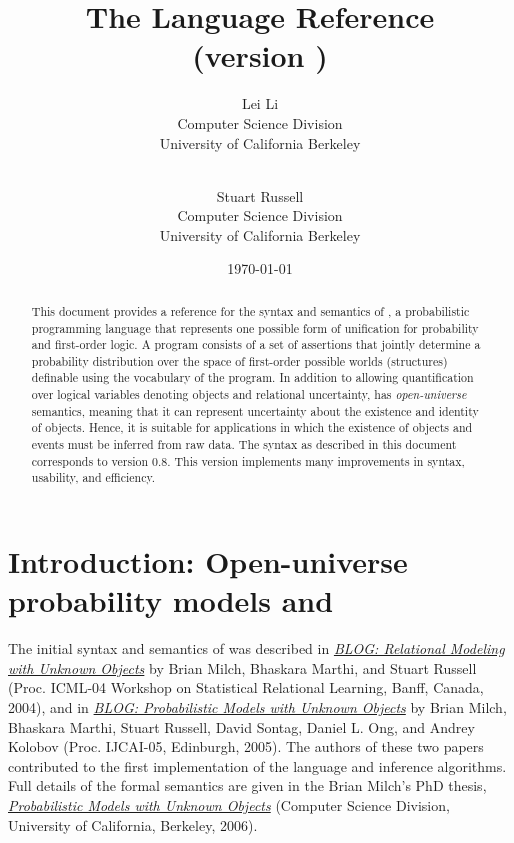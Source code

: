 \documentclass[12pt]{article}
\title{The \bl Language Reference  \\
{\large (\bl version \blogversion)}
}
\author{Lei Li\\
              Computer Science Division\\
              University of California Berkeley\\
               \email{leili@cs.berkeley.edu}\\
\and
               Stuart Russell\\
              Computer Science Division\\
              University of California Berkeley\\
               \email{russell@cs.berkeley.edu}
               }
\date{\today}
\newcommand{\blogversion}{0.8\xspace}
\begin{document}
\maketitle


\begin{abstract}
This document provides a reference for the syntax and semantics of \bl, a probabilistic programming language
that represents one possible form of unification for probability and first-order logic.
A \bl program consists of a set of assertions that jointly determine a probability distribution
over the space of first-order possible worlds (structures) definable using the vocabulary of
the program. In addition to allowing quantification over logical variables denoting objects and relational uncertainty,
\bl has {\em open-universe} semantics, meaning that it can represent uncertainty about the existence and
identity of objects. Hence, it is suitable for applications in which the existence of objects and events must be inferred from raw data.
The syntax as described in this document corresponds to \bl version \blogversion. This version implements many
improvements in syntax, usability, and efficiency.
\end{abstract}

\clearpage

\tableofcontents

\clearpage

\section{Introduction: Open-universe probability models and \bl}\label{intro-section}

The initial syntax and semantics of \bl was described in 
\href{http://www.cs.berkeley.edu/~russell/papers/srl04-blog.pdf}{{\it BLOG: Relational Modeling with Unknown Objects}}
by Brian Milch, Bhaskara Marthi, and Stuart Russell (Proc. ICML-04 Workshop on Statistical Relational Learning, Banff, Canada, 2004),
and in 
\href{http://www.cs.berkeley.edu/~russell/papers/ijcai05-blog.pdf}{{\it BLOG: Probabilistic Models with Unknown Objects}}
by Brian Milch, Bhaskara Marthi, Stuart Russell, David Sontag, Daniel L. Ong, and Andrey Kolobov (Proc. IJCAI-05, Edinburgh, 2005).
The authors of these two papers contributed to the first implementation of the \bl language and inference algorithms.
Full details of the formal semantics are given in the Brian Milch's PhD thesis,
\href{https://sites.google.com/site/bmilch/papers/milch_thesis.pdf}{{\it Probabilistic Models with Unknown Objects}} (Computer Science Division, University of California, Berkeley, 2006).
\end{document}
